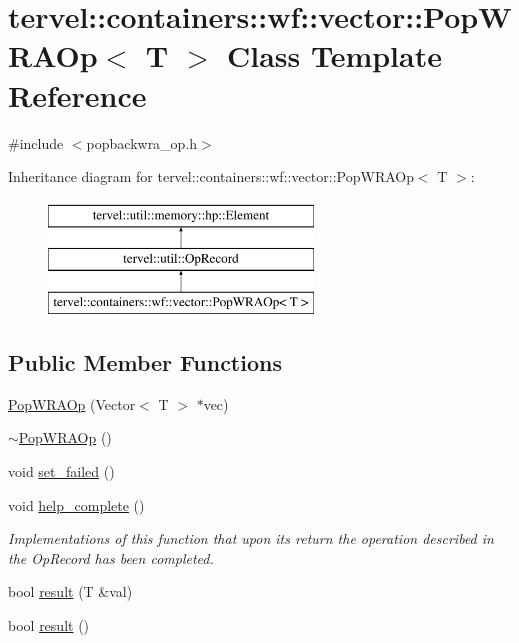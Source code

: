 \hypertarget{classtervel_1_1containers_1_1wf_1_1vector_1_1_pop_w_r_a_op}{}\section{tervel\+:\+:containers\+:\+:wf\+:\+:vector\+:\+:Pop\+W\+R\+A\+Op$<$ T $>$ Class Template Reference}
\label{classtervel_1_1containers_1_1wf_1_1vector_1_1_pop_w_r_a_op}


{\ttfamily \#include $<$popbackwra\+\_\+op.\+h$>$}

Inheritance diagram for tervel\+:\+:containers\+:\+:wf\+:\+:vector\+:\+:Pop\+W\+R\+A\+Op$<$ T $>$\+:\begin{figure}[H]
\begin{center}
\leavevmode
\includegraphics[height=3.000000cm]{classtervel_1_1containers_1_1wf_1_1vector_1_1_pop_w_r_a_op}
\end{center}
\end{figure}
\subsection*{Public Member Functions}
\begin{DoxyCompactItemize}
\item 
\hyperlink{classtervel_1_1containers_1_1wf_1_1vector_1_1_pop_w_r_a_op_acf35830bb35206909f2e65725848b2a0}{Pop\+W\+R\+A\+Op} (Vector$<$ T $>$ $\ast$vec)
\item 
\hyperlink{classtervel_1_1containers_1_1wf_1_1vector_1_1_pop_w_r_a_op_a8b7d9d55d71e5b322476dc0687c662ab}{$\sim$\+Pop\+W\+R\+A\+Op} ()
\item 
void \hyperlink{classtervel_1_1containers_1_1wf_1_1vector_1_1_pop_w_r_a_op_aaf425a7b0688f802c4ed134e8a5fc681}{set\+\_\+failed} ()
\item 
void \hyperlink{classtervel_1_1containers_1_1wf_1_1vector_1_1_pop_w_r_a_op_ab9dbcb928b3805f777856e2e35e9b461}{help\+\_\+complete} ()
\begin{DoxyCompactList}\small\item\em Implementations of this function that upon its return the operation described in the Op\+Record has been completed. \end{DoxyCompactList}\item 
bool \hyperlink{classtervel_1_1containers_1_1wf_1_1vector_1_1_pop_w_r_a_op_a3dcebe953f8462406063bbf98a9319f3}{result} (T \&val)
\item 
bool \hyperlink{classtervel_1_1containers_1_1wf_1_1vector_1_1_pop_w_r_a_op_ace647557e94685a3d0801f184c2e00e9}{result} ()
\end{DoxyCompactItemize}
